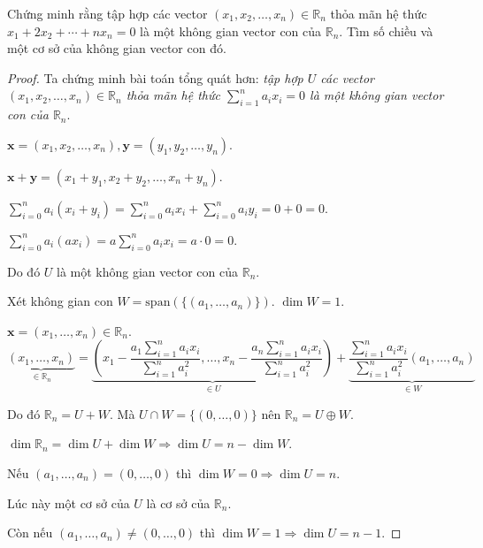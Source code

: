 \documentclass[class=linearalgebra,crop=false]{standalone}
\begin{document}
\begin{exercise}Chứng minh rằng tập hợp các vector $(x_{1}, x_{2}, \ldots, x_{n})\in\mathbb{R}_{n}$ thỏa mãn hệ thức $x_{1} + 2x_{2} + \cdots + nx_{n} = 0$ là một không gian vector con của $\mathbb{R}_{n}$. Tìm số chiều và một cơ sở của không gian vector con đó.
\end{exercise}

\begin{proof}Ta chứng minh bài toán tổng quát hơn: \textit{tập hợp $U$ các vector $(x_{1}, x_{2}, \ldots, x_{n})\in\mathbb{R}_{n}$ thỏa mãn hệ thức $\displaystyle\sum^{n}_{i=1}a_{i}x_{i} = 0$ là một không gian vector con của $\mathbb{R}_{n}$}.
    \par $\mathbf{x} = (x_{1}, x_{2}, \ldots, x_{n}), \mathbf{y} = (y_{1}, y_{2}, \ldots, y_{n})$.
    \par $\mathbf{x} + \mathbf{y} = (x_{1} + y_{1}, x_{2} + y_{2}, \ldots, x_{n} + y_{n})$.
    \par $\displaystyle\sum^{n}_{i=0}a_{i}(x_{i} + y_{i}) = \displaystyle\sum^{n}_{i=0}a_{i}x_{i} + \displaystyle\sum^{n}_{i=0}a_{i}y_{i} = 0 + 0 = 0$.
    \par $\displaystyle\sum^{n}_{i=0}a_{i}(ax_{i}) = a\displaystyle\sum^{n}_{i=0}a_{i}x_{i} = a\cdot 0 = 0$.
    \par Do đó $U$ là một không gian vector con của $\mathbb{R}_{n}$.
    \par Xét không gian con $W = \text{span}(\{(a_{1},\ldots, a_{n})\})$. $\dim W = 1$.
    \par $\mathbf{x} = (x_{1}, \ldots, x_{n}) \in \mathbb{R}_{n}$.
    \[
        \underbrace{(x_{1},\ldots, x_{n})}_{\in\mathbb{R}_{n}} = \underbrace{\left(x_{1} - \frac{a_{1}\sum^{n}_{i=1} a_{i}x_{i}}{\sum^{n}_{i=1} a^{2}_{i}},\ldots, x_{n} - \frac{a_{n}\sum^{n}_{i=1}a_{i}x_{i}}{\sum^{n}_{i=1}a^{2}_{i}}\right)}_{\in U} + \underbrace{\frac{\sum^{n}_{i=1}a_{i}x_{i}}{\sum^{n}_{i=1}a^{2}_{i}}(a_{1},\ldots,a_{n})}_{\in W}
    \]
    \par Do đó $\mathbb{R}_{n} = U + W$. Mà $U\cap W = \{ (0,\ldots, 0) \}$ nên $\mathbb{R}_{n} = U\oplus W$.
    \par $\dim\mathbb{R}_{n} = \dim U + \dim W \Rightarrow \dim U = n - \dim W$.
    \par Nếu $(a_{1},\ldots, a_{n}) = (0,\ldots,0)$ thì $\dim W = 0 \Rightarrow \dim U = n$.
    \par Lúc này một cơ sở của $U$ là cơ sở của $\mathbb{R}_{n}$.
    \par Còn nếu $(a_{1},\ldots, a_{n}) \ne (0,\ldots,0)$ thì $\dim W = 1\Rightarrow \dim U = n - 1$.

\end{proof}
\end{document}
